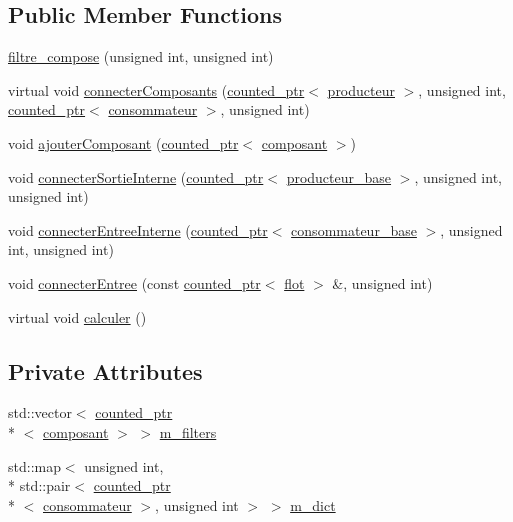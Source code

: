 \subsection*{Public Member Functions}
\begin{DoxyCompactItemize}
\item 
\hyperlink{classfiltre__compose_a7e3d377ce43f6dabc6709f57b9aaf4b6}{filtre\-\_\-compose} (unsigned int, unsigned int)
\item 
virtual void \hyperlink{classfiltre__compose_a7ac6503a5391d0f633203c0b094a6e9f}{connecter\-Composants} (\hyperlink{classcounted__ptr}{counted\-\_\-ptr}$<$ \hyperlink{classproducteur}{producteur} $>$, unsigned int, \hyperlink{classcounted__ptr}{counted\-\_\-ptr}$<$ \hyperlink{classconsommateur}{consommateur} $>$, unsigned int)
\item 
void \hyperlink{classfiltre__compose_a8b205525be2ba74557c5284ed72406a2}{ajouter\-Composant} (\hyperlink{classcounted__ptr}{counted\-\_\-ptr}$<$ \hyperlink{classcomposant}{composant} $>$)
\item 
void \hyperlink{classfiltre__compose_ad30c331895f65539dad8e62ed5fcfc04}{connecter\-Sortie\-Interne} (\hyperlink{classcounted__ptr}{counted\-\_\-ptr}$<$ \hyperlink{classproducteur__base}{producteur\-\_\-base} $>$, unsigned int, unsigned int)
\item 
void \hyperlink{classfiltre__compose_ad9c8d2f971d2a71859fad598d11e180b}{connecter\-Entree\-Interne} (\hyperlink{classcounted__ptr}{counted\-\_\-ptr}$<$ \hyperlink{classconsommateur__base}{consommateur\-\_\-base} $>$, unsigned int, unsigned int)
\item 
void \hyperlink{classfiltre__compose_aaf4dc84a41236fb7f462d6eba569baf1}{connecter\-Entree} (const \hyperlink{classcounted__ptr}{counted\-\_\-ptr}$<$ \hyperlink{classflot}{flot} $>$ \&, unsigned int)
\item 
virtual void \hyperlink{classfiltre__compose_a6fd1598c04300da43989af4f87a37aba}{calculer} ()
\end{DoxyCompactItemize}
\subsection*{Private Attributes}
\begin{DoxyCompactItemize}
\item 
std\-::vector$<$ \hyperlink{classcounted__ptr}{counted\-\_\-ptr}\\*
$<$ \hyperlink{classcomposant}{composant} $>$ $>$ \hyperlink{classfiltre__compose_ae857e33daea1b9afa3689322241dac33}{m\-\_\-filters}
\item 
std\-::map$<$ unsigned int, \\*
std\-::pair$<$ \hyperlink{classcounted__ptr}{counted\-\_\-ptr}\\*
$<$ \hyperlink{classconsommateur}{consommateur} $>$, unsigned int $>$ $>$ \hyperlink{classfiltre__compose_ab0a900380de582219751e3451104cfa7}{m\-\_\-dict}
\end{DoxyCompactItemize}
